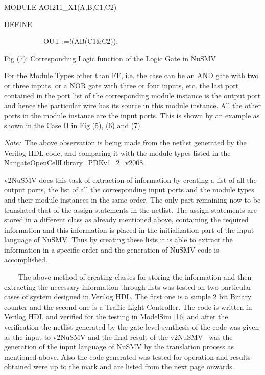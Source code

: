 \documentclass[a4paper]{article}
\begin{document}
\begin{center}
\begin{minipage}{6.00417in}
{\ttfamily\color[rgb]{0.0,0.0,0.039215688}
MODULE AOI211\_X1(A,B,C1,C2)}

{\ttfamily\color[rgb]{0.0,0.0,0.039215688}
DEFINE}

{\ttfamily\color[rgb]{0.0,0.0,0.039215688}
\ \ \ \ \ \ \ \ \ \ \ OUT :=!(A{\textbar}B{\textbar}(C1\&C2));}


\bigskip
\end{minipage}
\end{center}

\bigskip

{\centering\color[rgb]{0.0,0.0,0.039215688}
\textrm{Fig (7): Corresponding Logic function of the Logic Gate in
NuSMV}
\par}

{\color[rgb]{0.0,0.0,0.039215688}
\textrm{For the Module Types other than FF, i.e. the case can be an AND
gate with two or three inputs, or a NOR gate with three or four inputs,
etc. the last port contained in the port list of the corresponding
module instance is the output port and hence the particular wire has
its source in this module instance. All the other ports in the module
instance are the input ports. This is shown by an example as shown in
the Case II in Fig (5), (6) and (7).\ }}

{\color[rgb]{0.0,0.0,0.039215688}
\textrm{\textit{Note:\ }}\textrm{The above observation is being made
from the netlist generated by the Verilog HDL code, and comparing it
with the module types listed in the
NangateOpenCellLibrary\_PDKv1\_2\_v2008.\ }}

{\color[rgb]{0.0,0.0,0.039215688}
\textrm{v2NuSMV does this task of extraction of information by creating
a list of all the output ports, the list of all the corresponding input
ports and the module types and their module instances in the same
order. The only part remaining now to be translated that of the assign
statements in the netlist. The assign statements are stored in a
different class as already mentioned above, containing the required
information and this information is placed in the initialization part
of the input language of NuSMV. Thus by creating these lists it is able
to extract the information in a specific order and the generation of
NuSMV code is accomplished.}}

{\color[rgb]{0.0,0.0,0.039215688}
\textrm{\ \ }\textrm{\ \ The above method of creating classes for
storing the information and then extracting the necessary information
through lists was tested on two particular cases of system designed in
Verilog HDL. The first one is a simple 2 bit Binary counter and the
second one is a Traffic Light Controller. The code is written in
Verilog HDL and verified for the testing in ModelSim [16] and after the
verification the netlist generated by the gate level synthesis of the
code was given as the input to v2NuSMV and the final result of the
v2NuSMV \ was the generation of the input language of NuSMV by the
translation process as mentioned above. Also the code generated was
tested for operation and results obtained were up to the mark and are
listed from the next page onwards.\ }}
\end{document}
